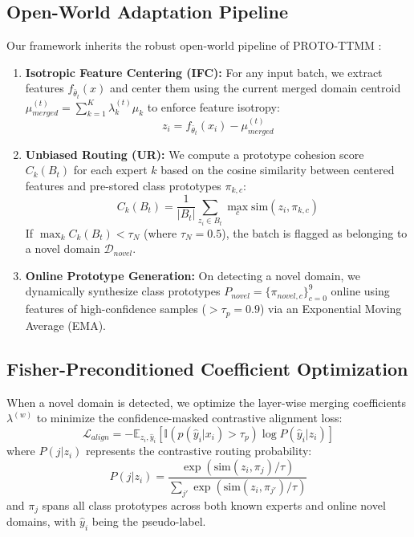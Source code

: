 \documentclass{article}
\theoremstyle{plain}
\theoremstyle{definition}
\theoremstyle{remark}
\begin{document}
\subsection{Open-World Adaptation Pipeline}
Our framework inherits the robust open-world pipeline of PROTO-TTMM \cite{proto_ttmm}:
\begin{enumerate}
  \item \textbf{Isotropic Feature Centering (IFC):} For any input batch, we extract features $f_{\bar{\theta}_t}(x)$ and center them using the current merged domain centroid $\mu_{merged}^{(t)} = \sum_{k=1}^K \lambda_k^{(t)} \mu_k$ to enforce feature isotropy:
  \begin{equation}
    z_i = f_{\bar{\theta}_t}(x_i) - \mu_{merged}^{(t)}
  \end{equation}
  \item \textbf{Unbiased Routing (UR):} We compute a prototype cohesion score $C_k(B_t)$ for each expert $k$ based on the cosine similarity between centered features and pre-stored class prototypes $\pi_{k,c}$:
  \begin{equation}
    C_k(B_t) = \frac{1}{|B_t|} \sum_{z_i \in B_t} \max_{c} \text{sim}(z_i, \pi_{k,c})
  \end{equation}
  If $\max_k C_k(B_t) < \tau_N$ (where $\tau_N = 0.5$), the batch is flagged as belonging to a novel domain $\mathcal{D}_{novel}$.
  \item \textbf{Online Prototype Generation:} On detecting a novel domain, we dynamically synthesize class prototypes $P_{novel} = \{\pi_{novel, c}\}_{c=0}^9$ online using features of high-confidence samples ($> \tau_p = 0.9$) via an Exponential Moving Average (EMA).
\end{enumerate}

\subsection{Fisher-Preconditioned Coefficient Optimization}
When a novel domain is detected, we optimize the layer-wise merging coefficients $\lambda^{(w)}$ to minimize the confidence-masked contrastive alignment loss:
\begin{equation}
  \mathcal{L}_{align} = -\mathbb{E}_{z_i, \hat{y}_i} \left[ \mathbb{I}(p(\hat{y}_i|x_i) > \tau_p) \log P(\hat{y}_i | z_i) \right]
\end{equation}
where $P(j | z_i)$ represents the contrastive routing probability:
\begin{equation}
  P(j | z_i) = \frac{ \exp(\text{sim}(z_i, \pi_j) / \tau) }{ \sum_{j'} \exp(\text{sim}(z_i, \pi_{j'}) / \tau) }
\end{equation}
and $\pi_j$ spans all class prototypes across both known experts and online novel domains, with $\hat{y}_i$ being the pseudo-label.
\end{document}
